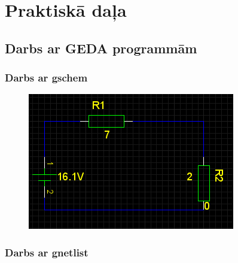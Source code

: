 \documentclass{report}
\begin{document}
\chapter{Praktiskā daļa}
\section{Darbs ar GEDA programmām}
\subsection{Darbs ar gschem}
\begin{figure}[h]
    \centering
    \includegraphics{shema.png}
    \caption{}
    \label{fig:sh2}
\end{figure}

\newpage
\subsection{Darbs ar gnetlist}

\end{document}
